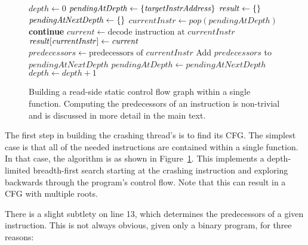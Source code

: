 \begin{figure}
\begin{algorithmic}[1]
\State $\mathit{depth} \gets 0$
\State $\mathit{pendingAtDepth} \gets \{\mathit{targetInstrAddress}\}$
\State $\mathit{result} \gets \{\}$
  \State $\mathit{pendingAtNextDepth} \gets \{\}$
    \State $\mathit{currentInstr} \gets \mathit{pop}(\mathit{pendingAtDepth})$
      \State \textbf{continue}
    \EndIf
    \State $\mathit{current} \gets \text{decode instruction at } \mathit{currentInstr}$
    \State $\mathit{result}[\mathit{currentInstr}] \gets \mathit{current}$
    \State $\mathit{predecessors} \gets \text{predecessors of } \mathit{currentInstr}$
    \State Add $\mathit{predecessors}$ to $\mathit{pendingAtNextDepth}$
  \EndWhile
  \State $\mathit{pendingAtDepth} \gets \mathit{pendingAtNextDepth}$
  \State $\mathit{depth} \gets \mathit{depth} + 1$
\EndWhile
\end{algorithmic}
\caption{Building a read-side static control flow graph within a
  single function.  Computing the predecessors of an instruction is
  non-trivial and is discussed in more detail in the main text.}
\label{fig:derive:static_read_cfg_single_function}
\end{figure}

The first step in building the crashing thread's {\StateMachine} is to
find its CFG.  The simplest case is that all of the needed
instructions are contained within a single function.  In that case,
the algorithm is as shown in
Figure~\ref{fig:derive:static_read_cfg_single_function}.  This
implements a depth-limited breadth-first search starting at the
crashing instruction and exploring backwards through the program's
control flow.  Note that this can result in a CFG with multiple roots.

There is a slight subtlety on line 13, which determines the
predecessors of a given instruction.  This is not always obvious,
given only a binary program, for three reasons:

